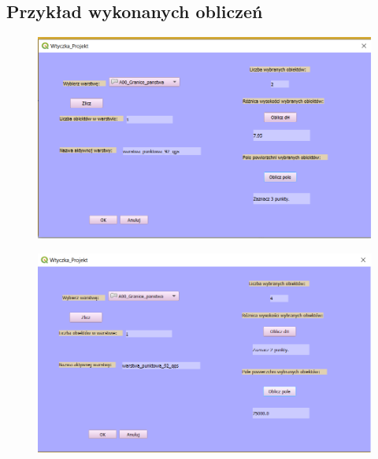 \documentclass[a4paper,12pt]{article}
\begin{document}
	\subsection{Przykład wykonanych obliczeń}
	\begin{figure}[H]
		\centering
		\includegraphics[width=1\textwidth]{dz.png}
		\end{figure}
	\begin{figure}[H]
		\centering
		\includegraphics[width=1\textwidth]{dp.png}
	\end{figure}
\end{document}
